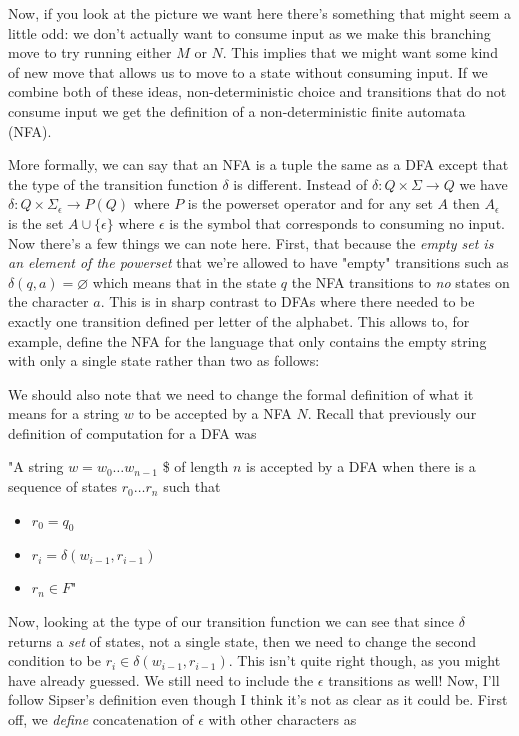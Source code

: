 \documentclass[11pt]{article}
\begin{document}
Now, if you look at the picture we want here there's something that might seem a little odd: we don't actually want to consume input as we make this branching move to try running either $M$ or $N$. This implies that we might want some kind of new move that allows us to move to a state without consuming input. If we combine both of these ideas, non-deterministic choice and transitions that do not consume input we get the definition of a non-deterministic finite automata (NFA). 

More formally, we can say that an NFA is a tuple the same as a DFA except that the type of the transition function $\delta$ is different. Instead of $\delta : Q \times \Sigma \to Q$ we have $\delta : Q \times \Sigma_{\epsilon} \to P(Q)$ where $P$ is the powerset operator and for any set $A$ then $A_{\epsilon}$ is the set $A \cup \{\epsilon\}$ where $\epsilon$ is the symbol that corresponds to consuming no input. Now there's a few things we can note here. First, that because the \emph{empty set is an element of the powerset} that we're allowed to have "empty" transitions such as $\delta(q,a) = \varnothing$ which means that in the state $q$ the NFA transitions to \emph{no} states on the character $a$. This is in sharp contrast to DFAs where there needed to be exactly one transition defined per letter of the alphabet. This allows to, for example, define the NFA for the language that only contains the empty string with only a single state rather than two as follows:

We should also note that we need to change the formal definition of what it means for a string $w$ to be accepted by a NFA $N$. Recall that previously our definition of computation for a DFA was 

"A string $w = w_0 \ldots w_{n-1}$ \$ of length $n$ is accepted by a DFA when there is a sequence of states $r_0 \ldots r_n$ such that 
\begin{itemize}
\item $r_0 = q_0$
\item $r_i = \delta (w_{i-1},r_{i-1})$
\item $r_n \in F$"
\end{itemize}

Now, looking at the type of our transition function we can see that since $\delta$ returns a \emph{set} of states, not a single state, then we need to change the second condition to be $r_i \in \delta (w_{i-1},r_{i-1})$. This isn't quite right though, as you might have already guessed. We still need to include the $\epsilon$ transitions as well! Now, I'll follow Sipser's definition even though I think it's not as clear as it could be. First off, we \emph{define} concatenation of $\epsilon$ with other characters as
\end{document}

